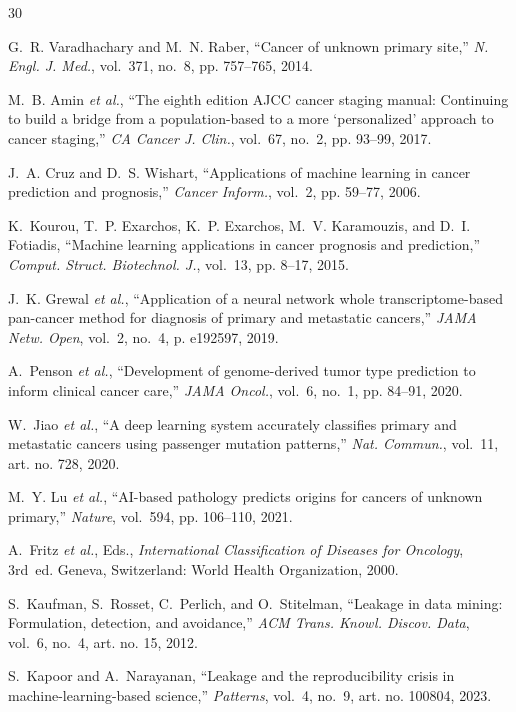 \begin{thebibliography}{30}
\small

G.~R. Varadhachary and M.~N. Raber, ``Cancer of unknown primary site,'' \emph{N. Engl. J. Med.}, vol.~371, no.~8, pp. 757--765, 2014.

M.~B. Amin \emph{et al.}, ``The eighth edition AJCC cancer staging manual: Continuing to build a bridge from a population-based to a more `personalized' approach to cancer staging,'' \emph{CA Cancer J. Clin.}, vol.~67, no.~2, pp. 93--99, 2017.

J.~A. Cruz and D.~S. Wishart, ``Applications of machine learning in cancer prediction and prognosis,'' \emph{Cancer Inform.}, vol.~2, pp. 59--77, 2006.

K.~Kourou, T.~P. Exarchos, K.~P. Exarchos, M.~V. Karamouzis, and D.~I. Fotiadis, ``Machine learning applications in cancer prognosis and prediction,'' \emph{Comput. Struct. Biotechnol. J.}, vol.~13, pp. 8--17, 2015.

J.~K. Grewal \emph{et al.}, ``Application of a neural network whole transcriptome-based pan-cancer method for diagnosis of primary and metastatic cancers,'' \emph{JAMA Netw. Open}, vol.~2, no.~4, p. e192597, 2019.

A.~Penson \emph{et al.}, ``Development of genome-derived tumor type prediction to inform clinical cancer care,'' \emph{JAMA Oncol.}, vol.~6, no.~1, pp. 84--91, 2020.

W.~Jiao \emph{et al.}, ``A deep learning system accurately classifies primary and metastatic cancers using passenger mutation patterns,'' \emph{Nat. Commun.}, vol.~11, art. no. 728, 2020.

M.~Y. Lu \emph{et al.}, ``AI-based pathology predicts origins for cancers of unknown primary,'' \emph{Nature}, vol.~594, pp. 106--110, 2021.

A.~Fritz \emph{et al.}, Eds., \emph{International Classification of Diseases for Oncology}, 3rd~ed. Geneva, Switzerland: World Health Organization, 2000.

S.~Kaufman, S.~Rosset, C.~Perlich, and O.~Stitelman, ``Leakage in data mining: Formulation, detection, and avoidance,'' \emph{ACM Trans. Knowl. Discov. Data}, vol.~6, no.~4, art. no. 15, 2012.

S.~Kapoor and A.~Narayanan, ``Leakage and the reproducibility crisis in machine-learning-based science,'' \emph{Patterns}, vol.~4, no.~9, art. no. 100804, 2023.


\end{thebibliography}
